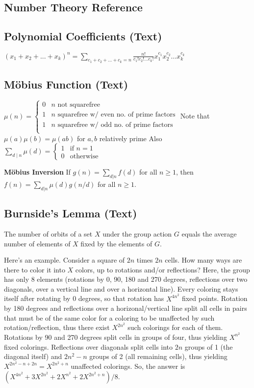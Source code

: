\documentclass[10pt]{extarticle}
\begin{document}
\begin{multicols*}{3}
\section{Number Theory Reference}
\subsection{Polynomial Coefficients (Text)} %
$(x_1 + x_2 + ... + x_k)^n = \sum_{c_1 + c_2 + ... + c_k = n}
\frac{n!}{c_1! c_2! ... c_k!} x_1^{c_1} x_2^{c_2} ... x_k^{c_k}$

\subsection{M\"obius Function (Text)} %
$\mu(n) = \begin{cases}
0 & \text{$n$ not squarefree} \\
1 & \text{$n$ squarefree w/ even no. of prime factors} \\
1 & \text{$n$ squarefree w/ odd no. of prime factors} \\
\end{cases}$
Note that $\mu(a) \mu(b) = \mu(ab)$ for $a, b$ relatively prime
Also $\sum_{d \mid n} \mu(d) = \begin{cases} 1 & \text{if $n = 1$} \\
0 & \text{otherwise} \end{cases}$

\textbf{M\"obius Inversion}
If $g(n) = \sum_{d|n} f(d)$ for all $n \ge 1$, then
$f(n) = \sum_{d|n} \mu(d)g(n/d)$ for all $n \ge 1$.

\subsection{Burnside's Lemma (Text)} %
The number of orbits of a set $X$ under the group action $G$ equals the average
number of elements of $X$ fixed by the elements of $G$.

Here's an example. Consider a square of $2n$ times $2n$ cells. How many ways
are there to color it into $X$ colors, up to rotations and/or reflections?
Here, the group has only 8 elements (rotations by 0, 90, 180 and 270 degrees,
reflections over two diagonals, over a vertical line and over a horizontal
line). Every coloring stays itself after rotating by 0 degrees, so that
rotation has $X^{4n^2}$ fixed points. Rotation by 180 degrees and reflections
over a horizonal/vertical line split all cells in pairs that must be of the
same color for a coloring to be unaffected by such rotation/reflection, thus
there exist $X^{2n^2}$ such colorings for each of them. Rotations by 90 and 270
degrees split cells in groups of four, thus yielding $X^{n^2}$ fixed colorings.
Reflections over diagonals split cells into $2n$ groups of 1 (the diagonal
itself) and $2n^2-n$ groups of 2 (all remaining cells), thus yielding
$X^{2n^2-n+2n}=X^{2n^2+n}$ unaffected colorings.  So, the answer is
$(X^{4n^2}+3X^{2n^2}+2X^{n^2}+2X^{2n^2+n})/8$.



\end{multicols*}
\end{document}
